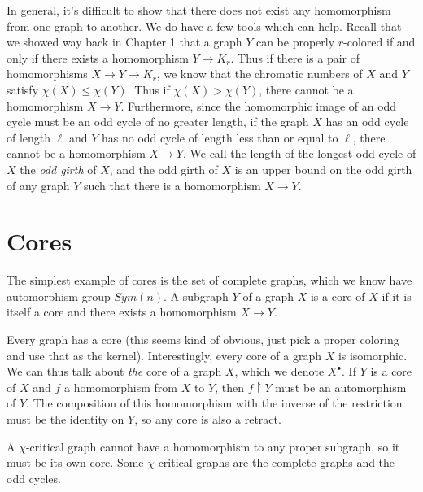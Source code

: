 In general, it's difficult to show that there does not exist any homomorphism from one graph to another.  We do have a few tools which can help.  Recall that we showed way back in Chapter 1 that a graph $Y$ can be properly $r$-colored if and only if there exists a homomorphism $Y\rightarrow K_r$.  Thus if there is a pair of homomorphisms $X\rightarrow Y\rightarrow K_r$, we know that the chromatic numbers of $X$ and $Y$ satisfy $\chi(X)\leq \chi(Y)$.  Thus if $\chi(X)>\chi(Y)$, there cannot be a homomorphism $X\rightarrow Y$.  Furthermore, since the homomorphic image of an odd cycle must be an odd cycle of no greater length, if the graph $X$ has an odd cycle of length $\ell$ and $Y$ has no odd cycle of length less than or equal to $\ell$, there cannot be a homomorphism $X\rightarrow Y$.  We call the length of the longest odd cycle of $X$ the \textit{odd girth} of $X$, and the odd girth of $X$ is an upper bound on the odd girth of any graph $Y$ such that there is a homomorphism $X\rightarrow Y$.


\section*{Cores}


The simplest example of cores is the set of complete graphs, which we know have automorphism group $Sym(n)$.  A subgraph $Y$ of a graph $X$ is a core of $X$ if it is itself a core and there exists a homomorphism $X\rightarrow Y$.

Every graph has a core (this seems kind of obvious, just pick a proper coloring and use that as the kernel).  Interestingly, every core of a graph $X$ is isomorphic.  We can thus talk about \textit{the} core of a graph $X$, which we denote $X^\bullet$.  If $Y$ is a core of $X$ and $f$ a homomorphism from $X$ to $Y$, then $f\upharpoonright Y$ must be an automorphism of $Y$.  The composition of this homomorphism with the inverse of the restriction must be the identity on $Y$, so any core is also a retract.


A $\chi$-critical graph cannot have a homomorphism to any proper subgraph, so it must be its own core.  Some $\chi$-critical graphs are the complete graphs and the odd cycles.

